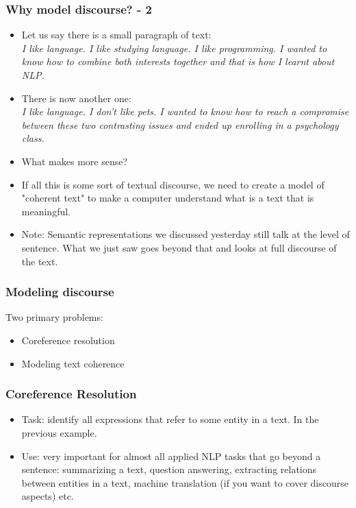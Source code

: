 \documentclass{beamer}
\begin{document}
\begin{frame}
\frametitle{Why model discourse? - 2}
\begin{itemize}
\item Let us say there is a small paragraph of text: 
\\ \textit{I like language. I like studying language. I like programming. I wanted to know how to combine both interests together and that is how I learnt about NLP.}
\item  There is now another one:
\\ \textit{I like language. I don't like pets. I wanted to know how to reach a compromise between these two contrasting issues and ended up enrolling in a psychology class. }
\item What makes more sense? \pause
\item If all this is some sort of textual discourse, we need to create a model of "coherent text" to make a computer understand what is a text that is meaningful.
\item Note: Semantic representations we discussed yesterday still talk at the level of sentence. What we just saw goes beyond that and looks at full discourse of the text.  
\end{itemize}
\end{frame}

\begin{frame}
\frametitle{Modeling discourse}
Two primary problems:
\begin{itemize}
\item Coreference resolution
\item Modeling text coherence
\end{itemize}
\end{frame}

\begin{frame}
\frametitle{Coreference Resolution}
\begin{itemize}
\item Task: identify all expressions that refer to some entity in a text. In the previous example.
\item Use: very important for almost all applied NLP tasks that go beyond a sentence: summarizing a text, question answering, extracting relations between entities in a text, machine translation (if you want to cover discourse aspects) etc. 
\end{itemize}
\end{frame}
\end{document}
